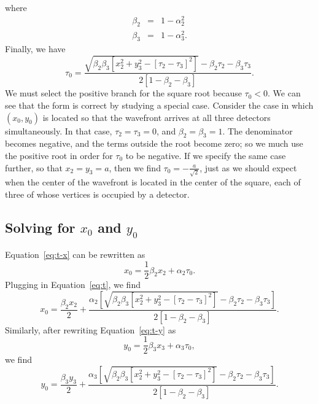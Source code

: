 \documentclass[twocolumn]{article}
\begin{document}
where
\begin{eqnarray}
   \beta_2 &=& 1 - \alpha_2^2\\
   \beta_3 &=& 1 - \alpha_3^2.
\end{eqnarray}
Finally, we have
\begin{equation}
   \tau_0 = \frac{ \sqrt{\beta_2 \beta_3 \left[x_2^2 + y_3^2 - \left[\tau_2 -
            \tau_3\right]^2\right]} - \beta_2 \tau_2 - \beta_3 \tau_3 }{2
            \left[1 - \beta_2 - \beta_3\right]}.
   \label{eq:t}
\end{equation}
We must select the positive branch for the square root because $\tau_0 < 0$.
We can see that the form is correct by studying a special case.  Consider the
case in which $(x_0, y_0)$ is located so that the wavefront arrives at all
three detectors simultaneously.  In that case, $\tau_2 = \tau_3 = 0$, and
$\beta_2 = \beta_3 = 1$.  The denominator becomes negative, and the terms
outside the root become zero; so we much use the positive root in order for
$\tau_0$ to be negative.  If we specify the same case further, so that $x_2 =
y_3 = a$, then we find $\tau_0 = -\frac{a}{\sqrt{2}}$, just as we should expect
when the center of the wavefront is located in the center of the square, each
of three of whose vertices is occupied by a detector.

\subsection{Solving for $x_0$ and $y_0$}

Equation~\ref{eq:t-x} can be rewritten as
\begin{equation}
   x_0 = \frac{1}{2} \beta_2 x_2 + \alpha_2 \tau_0.
\end{equation}
Plugging in Equation~\ref{eq:t}, we find
\begin{equation}
   x_0 = \frac{\beta_2 x_2}{2} + \frac{ \alpha_2 \left[\sqrt{\beta_2
         \beta_3 \left[x_2^2 + y_3^2 - \left[\tau_2 - \tau_3\right]^2\right]} -
         \beta_2 \tau_2 - \beta_3 \tau_3\right]}{2 \left[1 - \beta_2 -
         \beta_3\right]}.
\end{equation}
Similarly, after rewriting Equation~\ref{eq:t-y} as
\begin{equation}
   y_0 = \frac{1}{2} \beta_3 x_3 + \alpha_3 \tau_0,
\end{equation}
we find
\begin{equation}
   y_0 = \frac{\beta_3 y_3}{2} + \frac{ \alpha_3 \left[\sqrt{\beta_2
         \beta_3 \left[x_2^2 + y_3^2 - \left[\tau_2 - \tau_3\right]^2\right]} -
         \beta_2 \tau_2 - \beta_3 \tau_3\right]}{2 \left[1 - \beta_2 -
         \beta_3\right]}.
\end{equation}

%
%
%
%

\newpage


\end{document}
